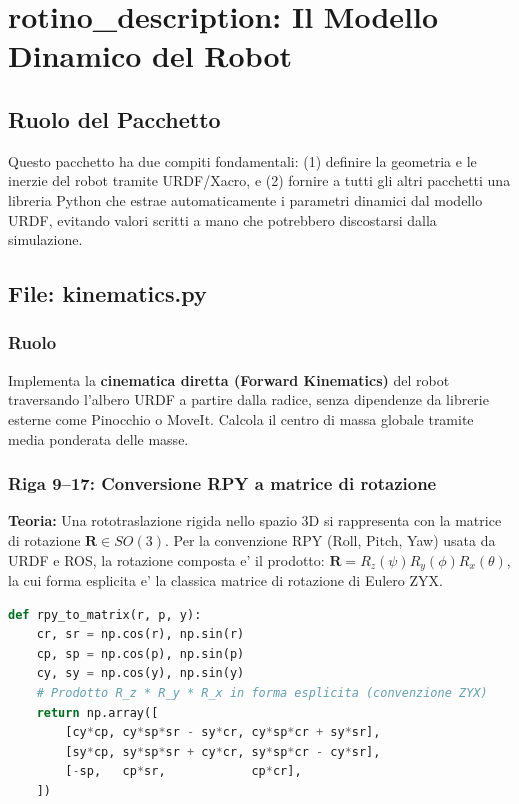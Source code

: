 \documentclass[11pt,a4paper]{report}
\begin{document}
\chapter{rotino\_description: Il Modello Dinamico del Robot}

\section{Ruolo del Pacchetto}
Questo pacchetto ha due compiti fondamentali: (1) definire la geometria
e le inerzie del robot tramite URDF/Xacro, e (2) fornire a tutti gli altri
pacchetti una libreria Python che estrae automaticamente i parametri
dinamici dal modello URDF, evitando valori scritti a mano che potrebbero
discostarsi dalla simulazione.

\section{File: kinematics.py}

\subsection{Ruolo}
Implementa la \textbf{cinematica diretta (Forward Kinematics)} del robot
traversando l'albero URDF a partire dalla radice, senza dipendenze da
librerie esterne come Pinocchio o MoveIt. Calcola il centro di massa
globale tramite media ponderata delle masse.

\subsection{Riga 9--17: Conversione RPY a matrice di rotazione}

\begin{theoryframe}
\textbf{Teoria:} Una rototraslazione rigida nello spazio 3D si rappresenta con
la matrice di rotazione $\mathbf{R} \in SO(3)$. Per la convenzione RPY (Roll,
Pitch, Yaw) usata da URDF e ROS, la rotazione composta e' il prodotto:
$\mathbf{R} = R_z(\psi) R_y(\phi) R_x(\theta)$, la cui forma esplicita e' la
classica matrice di rotazione di Eulero ZYX.
\end{theoryframe}

\begin{lstlisting}[language=Python, caption=kinematics.py rr.\ 9-17: Matrice di rotazione da angoli RPY]
def rpy_to_matrix(r, p, y):
    cr, sr = np.cos(r), np.sin(r)
    cp, sp = np.cos(p), np.sin(p)
    cy, sy = np.cos(y), np.sin(y)
    # Prodotto R_z * R_y * R_x in forma esplicita (convenzione ZYX)
    return np.array([
        [cy*cp, cy*sp*sr - sy*cr, cy*sp*cr + sy*sr],
        [sy*cp, sy*sp*sr + cy*cr, sy*sp*cr - cy*sr],
        [-sp,   cp*sr,            cp*cr],
    ])
\end{lstlisting}
\end{document}
